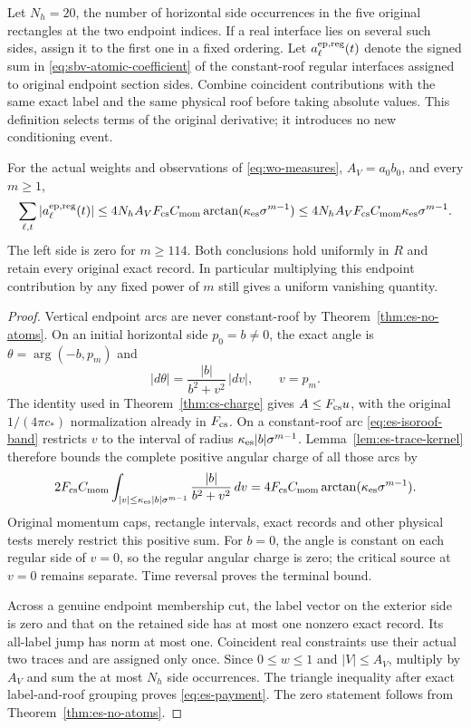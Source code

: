 Let $N_h=20$, the number of horizontal side occurrences in the
five original rectangles at the two endpoint indices.  If a real
interface lies on several such sides, assign it to the first one
in a fixed ordering.  Let $a^{\rm ep,reg}_\ell(t)$ denote the
signed sum in \eqref{eq:sbv-atomic-coefficient} of the
constant-roof regular interfaces assigned to original endpoint
section sides.  Combine coincident contributions with the same
exact label and the same physical roof before taking absolute
values.  This definition selects terms of the original derivative;
it introduces no new conditioning event.

\begin{theorem}
\label{thm:es-payment}
For the actual weights and observations of
\eqref{eq:wo-measures}, $A_V=a_0b_0$, and every $m\ge1$,
\begin{equation}\label{eq:es-payment}
 \sum_{\ell,t}|a^{\rm ep,reg}_\ell(t)|
 \le 4N_h A_VF_{\rm cs}C_{\rm mom}
       \arctan(\kappa_{\rm es}\sigma^{m-1})
 \le 4N_h A_VF_{\rm cs}C_{\rm mom}
                 \kappa_{\rm es}\sigma^{m-1}.
\end{equation}
The left side is zero for $m\ge114$.  Both conclusions hold
uniformly in $R$ and retain every original exact record.  In
particular multiplying this endpoint contribution by any fixed
power of $m$ still gives a uniform vanishing quantity.
\end{theorem}
\begin{proof}
Vertical endpoint arcs are never constant-roof by
Theorem~\ref{thm:es-no-atoms}.  On an initial horizontal side
$p_0=b\ne0$, the exact angle is $\theta=\arg(-b,p_m)$ and
\[
 |d\theta|=\frac{|b|}{b^2+v^2}\,|dv|,\qquad v=p_m.
\]
The identity used in Theorem~\ref{thm:cs-charge} gives
$A\le F_{\rm cs}u$, with the original $1/(4\pi c_*)$
normalization already in $F_{\rm cs}$.
On a constant-roof arc \eqref{eq:es-isoroof-band} restricts $v$
to the interval of radius $\kappa_{\rm es}|b|\sigma^{m-1}$.
Lemma~\ref{lem:es-trace-kernel} therefore bounds the complete
positive angular charge of all those arcs by
\[
 2F_{\rm cs}C_{\rm mom}
 \int_{|v|\le\kappa_{\rm es}|b|\sigma^{m-1}}
          \frac{|b|}{b^2+v^2}\,dv
 =4F_{\rm cs}C_{\rm mom}
           \arctan(\kappa_{\rm es}\sigma^{m-1}).
\]
Original momentum caps, rectangle intervals, exact records and
other physical tests merely restrict this positive sum.  For
$b=0$, the angle is constant on each regular side of $v=0$,
so the regular angular charge is zero; the critical source at
$v=0$ remains separate.  Time reversal proves the terminal bound.

Across a genuine endpoint membership cut, the label vector on
the exterior side is zero and that on the retained side has at
most one nonzero exact record.  Its all-label jump has norm at
most one.  Coincident real constraints use their actual two
traces and are assigned only once.  Since $0\le w\le1$ and
$|V|\le A_V$, multiply by $A_V$ and sum the at most $N_h$
side occurrences.  The triangle inequality after exact
label-and-roof grouping proves \eqref{eq:es-payment}.  The
zero statement follows from Theorem~\ref{thm:es-no-atoms}.
\end{proof}

